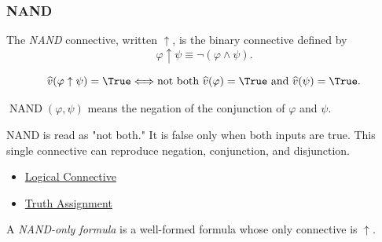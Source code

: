 \subsubsection*{NAND}

\begin{tcolorbox}[colback=propbox, colframe=propborder, arc=2pt,
  left=6pt, right=6pt, top=4pt, bottom=4pt,
  title={\small\textbf{Definition (NAND Connective)}},
  fonttitle=\small\bfseries]
\begin{definition}
\label{def:nand-connective-propositional-logic}
The \emph{NAND} connective, written \(\uparrow\), is the binary connective
defined by
\[
\varphi\uparrow\psi\equiv\neg(\varphi\land\psi).
\]
\end{definition}
\end{tcolorbox}

\begin{remark*}
\[
\widehat v(\varphi\uparrow\psi)=\True
\Longleftrightarrow
\text{not both }\widehat v(\varphi)=\True\text{ and }\widehat v(\psi)=\True.
\]
\end{remark*}

\begin{remark*}
\(\operatorname{NAND}(\varphi,\psi)\) means the negation of the conjunction of
\(\varphi\) and \(\psi\).
\end{remark*}

\begin{remark*}[Interpretation]
NAND is read as "not both." It is false only when both inputs are true. This
single connective can reproduce negation, conjunction, and disjunction.
\end{remark*}

\begin{dependencies}
\begin{itemize}
  \item \hyperref[def:logical-connective]{Logical Connective}
  \item \hyperref[def:truth-assignment-propositional-logic]{Truth Assignment}
\end{itemize}
\end{dependencies}

\begin{tcolorbox}[colback=propbox, colframe=propborder, arc=2pt,
  left=6pt, right=6pt, top=4pt, bottom=4pt,
  title={\small\textbf{Definition (NAND-Only Formula)}},
  fonttitle=\small\bfseries]
\begin{definition}
\label{def:nand-only-formula-propositional-logic}
A \emph{NAND-only formula} is a well-formed formula whose only connective is
\(\uparrow\).
\end{definition}
\end{tcolorbox}

